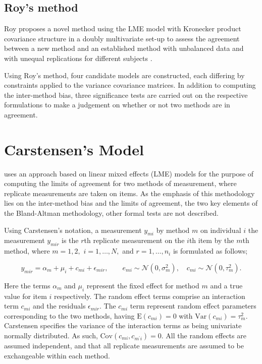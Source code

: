 \documentclass[12pt, a4paper]{report}
\theoremstyle{plain}
\theoremstyle{definition}
\theoremstyle{remark}
\begin{document}
\newpage




\subsection{Roy's method}


Roy proposes a novel method using the LME model with Kronecker product covariance structure in a doubly multivariate set-up to assess the agreement between a new method and an established method with unbalanced data and with unequal replications for different subjects \citep{Roy}.

Using Roy's method, four candidate models are constructed, each differing by constraints applied to the variance covariance matrices. In addition to computing the inter-method bias, three significance tests are carried out on the respective formulations to make a judgement on whether or not two methods are in agreement.


		\newpage
\section{Carstensen's Model}
\citet{BXC2008} uses an approach based on linear mixed effects (LME) models for the purpose of computing the limits of agreement for two methods of measurement, where replicate measurements are taken on items. As the emphasis of this methodology lies on the inter-method bias and the limits of agreement, the two key elements of the Bland-Altman methodology, other formal tests are not described.


Using Carstensen's notation, a measurement $y_{mi}$ by method $m$ on individual $i$ the measurement $y_{mir} $ is the $r$th replicate measurement on the $i$th item by the $m$th method, where $m=1,2,$ $i=1,\ldots,N,$ and $r = 1,\ldots,n_i$ is formulated as follows;

\begin{equation}
y_{mir}  = \alpha_{m} + \mu_{i} + c_{mi} + \epsilon_{mir}, \qquad  e_{mi}
\sim \mathcal{N}(0,\sigma^{2}_{m}), \quad c_{mi} \sim \mathcal{N}(0,\tau^{2}_{m}).
\end{equation}

Here the terms $\alpha_{m}$ and $\mu_{i}$ represent the fixed effect for method $m$ and a true value for item $i$ respectively. The random effect terms comprise an interaction term $c_{mi}$ and the residuals $\epsilon_{mir}$.
The $c_{mi}$ term represent random effect parameters corresponding to the two methods, having $\mathrm{E}(c_{mi})=0$ with $\mathrm{Var}(c_{mi})=\tau^2_m$. Carstensen specifies the variance of the interaction terms as being univariate normally distributed. As such, $\mathrm{Cov}(c_{mi}, c_{m^\prime i})= 0.$ All the random effects are assumed independent, and that all replicate measurements are assumed to be exchangeable within each method.
\end{document}
